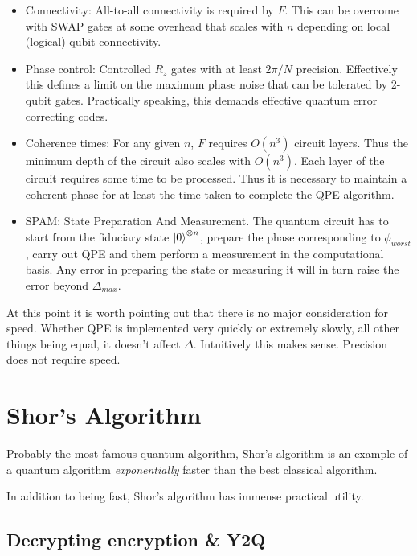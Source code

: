 \documentclass{book}
\begin{document}
\begin{itemize}
   \item Connectivity: All-to-all connectivity is required by $F$. This can be overcome with SWAP gates at some overhead that scales with $n$ depending on local (logical) qubit connectivity.
   \item Phase control: Controlled $R_z$ gates with at least $2\pi/N$ precision. Effectively this defines a limit on the maximum phase noise that can be tolerated by 2-qubit gates. Practically speaking, this demands effective quantum error correcting codes.
   \item Coherence times: For any given $n$, $F$ requires $O(n^3)$ circuit layers. Thus the minimum depth of the circuit also scales with $O(n^3)$. Each layer of the circuit requires some time to be processed. Thus it is necessary to maintain a coherent phase for at least the time taken to complete the QPE algorithm. 
   \item SPAM: State Preparation And Measurement. The quantum circuit has to start from the fiduciary state $\ket{0}^{\otimes n}$, prepare the phase corresponding to $\phi_{worst}$, carry out QPE and them perform a measurement in the computational basis. Any error in preparing the state or measuring it will in turn raise the error beyond $\Delta_{max}$.
\end{itemize}



At this point it is worth pointing out that there is no major consideration for speed. Whether QPE is implemented very quickly or extremely slowly, all other things being equal, it doesn't affect $\Delta $. Intuitively this makes sense. Precision does not require speed. 

\chapter{Shor's Algorithm}


Probably the most famous quantum algorithm, Shor's algorithm is an example of a quantum algorithm \textit{exponentially} faster than the best classical algorithm. 

In addition to being fast, Shor's algorithm has immense practical utility. 

\section{Decrypting encryption \& Y2Q}
\end{document}
